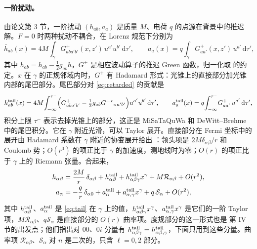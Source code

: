 \documentclass[11pt,a4paper]{ctexart}
\numberwithin{equation}{section}
\newcommand{\dd}{\mathrm d}
\begin{document}
\paragraph{一阶扰动。}由论文第 3 节，一阶扰动 $(h_{ab},a_a)$ 是质量 $M$、电荷 $q$ 的点源在背景中的推迟解。$F=0$ 时两种扰动不耦合，在 Lorenz 规范下分别为
\begin{equation}
\bar h_{ab}(x)=4M\!\int_\gamma G^+_{ab a'b'}(x,z')\,u^{a'}u^{b'}\,\dd\tau',\qquad
a_a(x)=q\!\int_\gamma G^+_{a a'}(x,z')\,u^{a'}\,\dd\tau',
\label{eq:retarded}
\end{equation}
其中 $\bar h_{ab}=h_{ab}-\tfrac12g_{ab}h$，$G^+$ 是相应波动算子的推迟 Green 函数，归一化取 \citet{PoissonPoundVega2011} 的约定。$x$ 在 $\gamma$ 的正规邻域内时，$G^+$ 有 Hadamard 形式：光锥上的直接部分加光锥内部的尾巴部分。尾巴部分对 \eqref{eq:retarded} 的贡献是
\begin{equation}
h^{\rm tail}_{ab}(x)=4M\!\int_{-\infty}^{\tau^-}\!\Big(G^+_{aba'b'}-\tfrac12g_{ab}G^{+\,c}{}_{c\,a'b'}\Big)u^{a'}u^{b'}\,\dd\tau',\qquad
a^{\rm tail}_a(x)=q\!\int_{-\infty}^{\tau^-}\!G^+_{aa'}\,u^{a'}\,\dd\tau',
\label{eq:tail}
\end{equation}
积分上限 $\tau^-$ 表示去掉光锥上的部分，这正是 MiSaTaQuWa \citep{MinoSasakiTanaka1997,QuinnWald1997} 和 DeWitt--Brehme \citep{DeWittBrehme1960} 中的尾巴积分。它在 $\gamma$ 附近光滑，可以 Taylor 展开。直接部分在 Fermi 坐标中的展开由 Hadamard 系数在 $\gamma$ 附近的协变展开给出 \citep{DeWittBrehme1960,PoissonPoundVega2011}：领头项是 $2M\delta_{\alpha\beta}/r$ 和 Coulomb 势；$O(r^0)$ 的项正比于 $\gamma$ 的加速度，测地线时为零；$O(r)$ 的项正比于 $\gamma$ 上的 Riemann 张量。合起来，
\begin{align}
h_{\alpha\beta}&=\frac{2M}{r}\,\delta_{\alpha\beta}+h^{\rm tail}_{\alpha\beta}+h^{\rm tail}_{\alpha\beta\gamma}x^\gamma+M\mathcal R_{\alpha\beta}+O(r^2),
\label{eq:hfar}\\
a_\alpha&=-\frac qr\,\delta_{\alpha0}+a^{\rm tail}_\alpha+a^{\rm tail}_{\alpha,\gamma}x^\gamma+q\,\mathcal S_\alpha+O(r^2),
\label{eq:afar}
\end{align}
其中 $h^{\rm tail}_{\alpha\beta}$、$a^{\rm tail}_\alpha$ 是 \eqref{eq:tail} 在 $\gamma$ 上的值，$h^{\rm tail}_{\alpha\beta\gamma}x^\gamma$、$a^{\rm tail}_{\alpha,\gamma}x^\gamma$ 是它们的一阶 Taylor 项，$M\mathcal R_{\alpha\beta}$、$q\mathcal S_\alpha$ 是直接部分的 $O(r)$ 曲率项。度规部分的这一形式也是 \citet{GrallaWald2008} 第 IV 节的出发点；他们指出对 $00$、$0i$ 分量有 $h^{\rm tail}_{\alpha\beta\gamma}=h^{\rm tail}_{\alpha\beta,\gamma}$，下面只用到这些分量。曲率项 $\mathcal R_{\alpha\beta}$、$\mathcal S_\alpha$ 对 $n$ 是二次的，只含 $\ell=0,2$ 部分。
\end{document}

